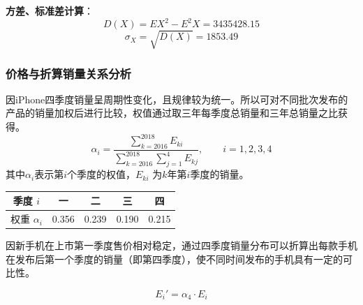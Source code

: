 \documentclass[12pt]{ctexart}
\begin{document}
        \textbf{方差、标准差计算}：
        \begin{equation} %
            D (X)=   EX^2 - E^2X= 3435428.15
        \end{equation} 
        \begin{equation} %
            \sigma _X =   \sqrt{D (X)}  = 1853.49
        \end{equation}
       
\newpage

    \subsubsection{价格与折算销量关系分析}
        因iPhone四季度销量呈周期性变化，且规律较为统一。所以可对不同批次发布的产品的销量加权后进行比较，权值通过取三年每季度总销量和三年总销量之比获得。
        \begin{equation} %
            \alpha _i= \frac{\sum\limits_{k = 2016}^{2018} E _{ki} }{ \sum\limits_{k = 2016}^{2018} \sum\limits_{j = 1}^{4}E _{kj} }, \qquad i=1,2,3,4
        \end{equation} 
        其中$\alpha _i$表示第$i$个季度的权值，$E _{ki}$ 为$k$年第$i$季度的销量。
        \begin{center}
            \begin{tabular}{|c|c|c|c|c|}
                \hline
                季度 $i$ & 一&二&三&四\\
                \hline
                权重 $\alpha _i$&0.356 &0.239&0.190 &0.215\\
                \hline
            \end{tabular}
        \end{center}
        \begin{center}
        \end{center}    
        因新手机在上市第一季度售价相对稳定，通过四季度销量分布可以折算出每款手机在发布后第一个季度的销量（即第四季度），使不同时间发布的手机具有一定的可比性。

        \begin{equation} %
            E _i ' = \alpha _4 \cdot  E _i
        \end{equation} 
\end{document}
